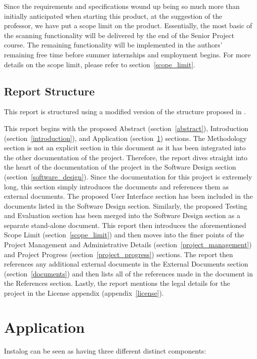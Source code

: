 \documentclass[letterpaper,12pt]{article}
\begin{document}
Since the requirements and specifications wound up being so much more than
initially anticipated when starting this product, at the suggestion of the
professor, we have put a scope limit on the product.  Essentially, the most
basic of the scanning functionality will be delivered by the end of the Senior
Project course.  The remaining functionality will be implemented in the authors'
remaining free time before summer internships and employment begins.  For more
details on the scope limit, please refer to section~\ref{scope_limit}.

\subsection{Report Structure}
This report is structured using a modified version of the structure proposed in
\cite{ReportGuidelines}.

This report begins with the proposed Abstract (section~\ref{abstract}),
Introduction (section~\ref{introduction}), and Application
(section~\ref{application}) sections.  The Methodology section is not an
explicit section in this document as it has been integrated into the other
documentation of the project.  Therefore, the report dives straight into the
heart of the documentation of the project in the Software Design section
(section~\ref{software_design}).  Since the documentation for this project is
extremely long, this section simply introduces the documents and references them
as external documents.  The proposed User Interface section has been included in
the documents listed in the Software Design section.  Similarly, the proposed
Testing and Evaluation section has been merged into the Software Design section
as a separate stand-alone document. This report then introduces the
aforementioned Scope Limit (section~\ref{scope_limit}) and then moves into the
finer points of the Project Management and Administrative Details
(section~\ref{project_management}) and Project Progress
(section~\ref{project_progress}) sections.  The report then references any
additional external documents in the External Documents section
(section~\ref{documents}) and then lists all of the references made in the
document in the References section.  Lastly, the report mentions the legal
details for the project in the License appendix (appendix~\ref{license}).

\newpage



\section{Application} \label{application}
Instalog can be seen as having three different distinct components:
\end{document}
